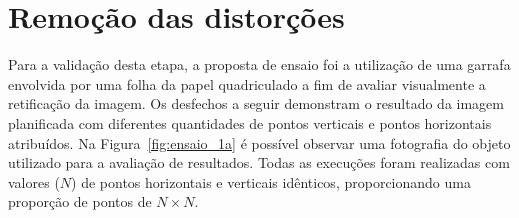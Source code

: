 \section{Remoção das distorções}

Para a validação desta etapa, a proposta de ensaio foi a utilização de uma garrafa envolvida por uma folha da papel quadriculado a fim de avaliar visualmente a retificação da imagem. Os desfechos a seguir demonstram o resultado da imagem planificada com diferentes quantidades de pontos verticais e pontos horizontais atribuídos. Na Figura~\ref{fig:ensaio_1a} é possível observar uma fotografia do objeto utilizado para a avaliação de resultados. Todas as execuções foram realizadas com valores ($N$) de pontos horizontais e verticais idênticos, proporcionando uma proporção de pontos de $N \times N$. 

